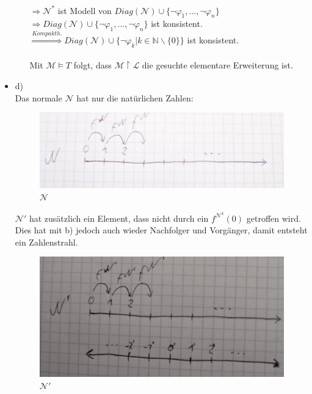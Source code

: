 \documentclass[a4paper]{scrartcl}%
\begin{document}
\begin{itemize}
\begin{itemize}
                    \\$\Rightarrow \mathcal{N}^*$ ist Modell von $Diag(\mathcal{N}) \cup \{\neg \varphi_1, \dots, \neg \varphi_n\}$\\
                    $\Rightarrow Diag(\mathcal{N}) \cup \{\neg \varphi_1, \dots, \neg \varphi_n\}$ ist konsistent.\\
                    $\overset{Kompakth.}{\Rightarrow} Diag(\mathcal{N}) \cup \{\neg \varphi_k | k \in \mathds{N}\backslash\{0\}\}$ ist konsistent.\\
                    \\Mit $\mathcal{M} \vDash T$ folgt, dass $\mathcal{M} \upharpoonright \mathscr{L}$ die gesuchte elementare Erweiterung ist.\\
            \end{itemize}
        \item d)\\
            Das normale $\mathcal{N}$ hat nur die natürlichen Zahlen:\\
            \begin{figure}[H]
                \centering
                \includegraphics[scale=0.2]{./N.JPG}
                \caption{$\mathcal{N}$}
                \label{fig:./DSC_0580}
            \end{figure}

\newpage

            $\mathcal{N}'$ hat zusätzlich ein Element, dass nicht durch ein $f^{\mathcal{N}^k}(0)$ getroffen wird.\\
            Dies hat mit b) jedoch auch wieder Nachfolger und Vorgänger, damit entsteht ein Zahlenstrahl.\\

            \begin{figure}[H]
                \centering
                \includegraphics[scale=0.2]{./N'.JPG}
                \caption{$\mathcal{N}'$}
                \label{fig:./DSC_0580}
            \end{figure}


\end{itemize}
\end{document}
